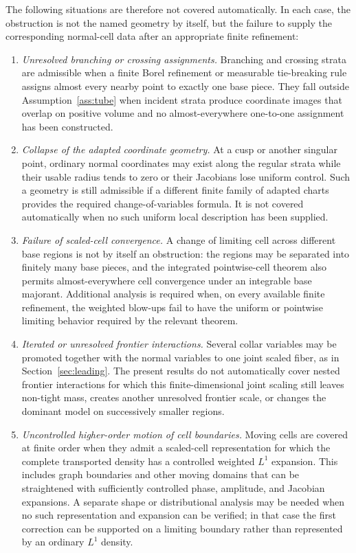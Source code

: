 \documentclass[11pt]{amsart}
\numberwithin{equation}{section}
\theoremstyle{definition}
\theoremstyle{remark}
\begin{document}
The following situations are therefore not covered automatically.  In each
case, the obstruction is not the named geometry by itself, but the failure to
supply the corresponding normal-cell data after an appropriate finite
refinement:

\begin{enumerate}[leftmargin=2.3em]

\item \emph{Unresolved branching or crossing assignments.}
Branching and crossing strata are admissible when a finite Borel refinement or
measurable tie-breaking rule assigns almost every nearby point to exactly one
base piece.  They fall outside Assumption~\ref{ass:tube} when incident strata
produce coordinate images that overlap on positive volume and no
almost-everywhere one-to-one assignment has been constructed.

\item \emph{Collapse of the adapted coordinate geometry.}
At a cusp or another singular point, ordinary normal coordinates may exist
along the regular strata while their usable radius tends to zero or their
Jacobians lose uniform control.  Such a geometry is still admissible if a
different finite family of adapted charts provides the required
change-of-variables formula.  It is not covered automatically when no such
uniform local description has been supplied.

\item \emph{Failure of scaled-cell convergence.}
A change of limiting cell across different base regions is not by itself an
obstruction: the regions may be separated into finitely many base pieces, and
the integrated pointwise-cell theorem also permits almost-everywhere cell
convergence under an integrable base majorant.  Additional analysis is required
when, on every available finite refinement, the weighted blow-ups fail to have
the uniform or pointwise limiting behavior required by the relevant theorem.

\item \emph{Iterated or unresolved frontier interactions.}
Several collar variables may be promoted together with the normal variables to
one joint scaled fiber, as in Section~\ref{sec:leading}.  The present results do
not automatically cover nested frontier interactions for which this
finite-dimensional joint scaling still leaves non-tight mass, creates another
unresolved frontier scale, or changes the dominant model on successively
smaller regions.

\item \emph{Uncontrolled higher-order motion of cell boundaries.}
Moving cells are covered at finite order when they admit a scaled-cell
representation for which the complete transported density has a controlled
weighted $L^1$ expansion.  This includes graph boundaries and other moving
domains that can be straightened with sufficiently controlled phase,
amplitude, and Jacobian expansions.  A separate shape or distributional
analysis may be needed when no such representation and expansion can be
verified; in that case the first correction can be supported on a limiting
boundary rather than represented by an ordinary $L^1$ density.


\end{enumerate}
\end{document}
